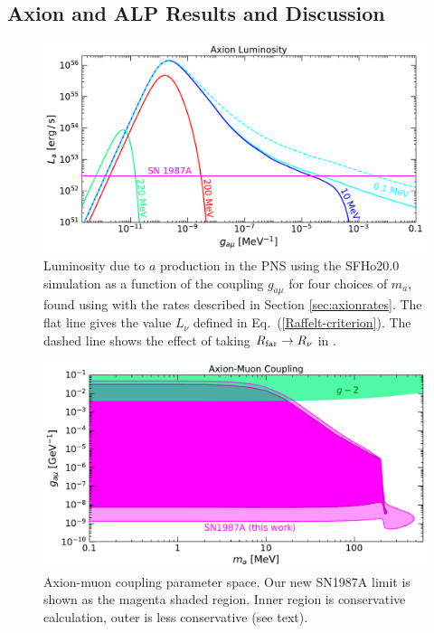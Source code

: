 \documentclass[11pt]{article}
\begin{document}
\subsection{Axion and ALP Results and Discussion}
\begin{figure}[t!] 
\centering
  \includegraphics[width=\columnwidth]{ax_L_vs_g.pdf} \caption{Luminosity due to $a$ production in the PNS using the SFHo20.0 simulation as a function of the coupling $g_{a \mu}$ for four choices of $m_a$, found using  with the rates described in Section \ref{sec:axionrates}. The flat line gives the value $L_\nu $ defined in Eq.~(\ref{Raffelt-criterion}). The dashed line shows the effect of taking $R_{\rm far} \to R_\nu$ in .}
  \label{fig:axionslum}
\end{figure}

\begin{figure}
  \includegraphics[width=\columnwidth]{axionmuon.pdf} \caption{Axion-muon coupling parameter space. Our new SN1987A limit is shown as the magenta shaded region. Inner region is conservative calculation, outer is less conservative (see text).}
  \label{fig:axions}
\end{figure}
\end{document}
